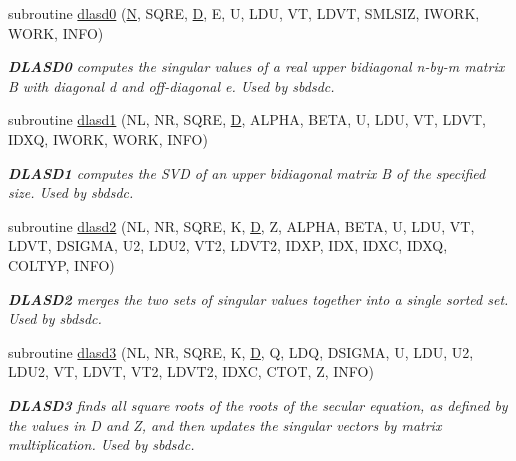 \begin{DoxyCompactItemize}
subroutine \hyperlink{group__auxOTHERauxiliary_gae17e31eb66deb0c5111275edbd302758}{dlasd0} (\hyperlink{polmisc_8c_a0240ac851181b84ac374872dc5434ee4}{N}, S\+Q\+R\+E, \hyperlink{odrpack_8h_a7dae6ea403d00f3687f24a874e67d139}{D}, E, U, L\+D\+U, V\+T, L\+D\+V\+T, S\+M\+L\+S\+I\+Z, I\+W\+O\+R\+K, W\+O\+R\+K, I\+N\+F\+O)
\begin{DoxyCompactList}\small\item\em {\bfseries D\+L\+A\+S\+D0} computes the singular values of a real upper bidiagonal n-\/by-\/m matrix B with diagonal d and off-\/diagonal e. Used by sbdsdc. \end{DoxyCompactList}\item 
subroutine \hyperlink{group__auxOTHERauxiliary_gae73e96812a1bfc42d43c9697971c82a6}{dlasd1} (N\+L, N\+R, S\+Q\+R\+E, \hyperlink{odrpack_8h_a7dae6ea403d00f3687f24a874e67d139}{D}, A\+L\+P\+H\+A, B\+E\+T\+A, U, L\+D\+U, V\+T, L\+D\+V\+T, I\+D\+X\+Q, I\+W\+O\+R\+K, W\+O\+R\+K, I\+N\+F\+O)
\begin{DoxyCompactList}\small\item\em {\bfseries D\+L\+A\+S\+D1} computes the S\+V\+D of an upper bidiagonal matrix B of the specified size. Used by sbdsdc. \end{DoxyCompactList}\item 
subroutine \hyperlink{group__auxOTHERauxiliary_ga32db876aadda88c12c75db105fe4f21c}{dlasd2} (N\+L, N\+R, S\+Q\+R\+E, K, \hyperlink{odrpack_8h_a7dae6ea403d00f3687f24a874e67d139}{D}, Z, A\+L\+P\+H\+A, B\+E\+T\+A, U, L\+D\+U, V\+T, L\+D\+V\+T, D\+S\+I\+G\+M\+A, U2, L\+D\+U2, V\+T2, L\+D\+V\+T2, I\+D\+X\+P, I\+D\+X, I\+D\+X\+C, I\+D\+X\+Q, C\+O\+L\+T\+Y\+P, I\+N\+F\+O)
\begin{DoxyCompactList}\small\item\em {\bfseries D\+L\+A\+S\+D2} merges the two sets of singular values together into a single sorted set. Used by sbdsdc. \end{DoxyCompactList}\item 
subroutine \hyperlink{group__auxOTHERauxiliary_ga791d0eee86fc85a3e132e613c55d1d56}{dlasd3} (N\+L, N\+R, S\+Q\+R\+E, K, \hyperlink{odrpack_8h_a7dae6ea403d00f3687f24a874e67d139}{D}, Q, L\+D\+Q, D\+S\+I\+G\+M\+A, U, L\+D\+U, U2, L\+D\+U2, V\+T, L\+D\+V\+T, V\+T2, L\+D\+V\+T2, I\+D\+X\+C, C\+T\+O\+T, Z, I\+N\+F\+O)
\begin{DoxyCompactList}\small\item\em {\bfseries D\+L\+A\+S\+D3} finds all square roots of the roots of the secular equation, as defined by the values in D and Z, and then updates the singular vectors by matrix multiplication. Used by sbdsdc. \end{DoxyCompactList}\item 

\end{DoxyCompactItemize}
